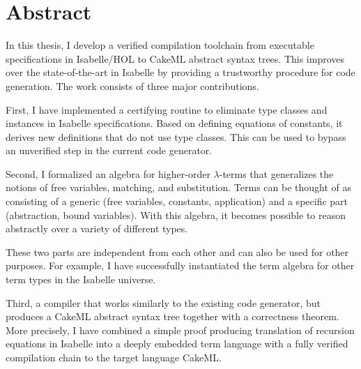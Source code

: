 
\section*{Abstract}

{

\setlength\parindent{0pt}
\setlength{\parskip}{10pt}

In this thesis, I develop a verified compilation toolchain from executable specifications in Isabelle/HOL to CakeML abstract syntax trees.
This improves over the state-of-the-art in Isabelle by providing a trustworthy procedure for code generation.
The work consists of three major contributions.

First, I have implemented a certifying routine to eliminate type classes and instances in Isabelle specifications.
Based on defining equations of constants, it derives new definitions that do not use type classes.
This can be used to bypass an unverified step in the current code generator.

Second, I formalized an algebra for higher-order $\lambda$-terms that generalizes the notions of free variables, matching, and substitution.
Terms can be thought of as consisting of a generic (free variables, constants, application) and a specific part (abstraction, bound variables).
With this algebra, it becomes possible to reason abstractly over a variety of different types.

These two parts are independent from each other and can also be used for other purposes.
For example, I have successfully instantiated the term algebra for other term types in the Isabelle universe.

Third, a compiler that works similarly to the existing code generator, but produces a CakeML abstract syntax tree together with a correctness theorem.
More precisely, I have combined a simple proof producing translation of recursion equations in Isabelle into a deeply embedded term language with a fully verified compilation chain to the target language CakeML.

}